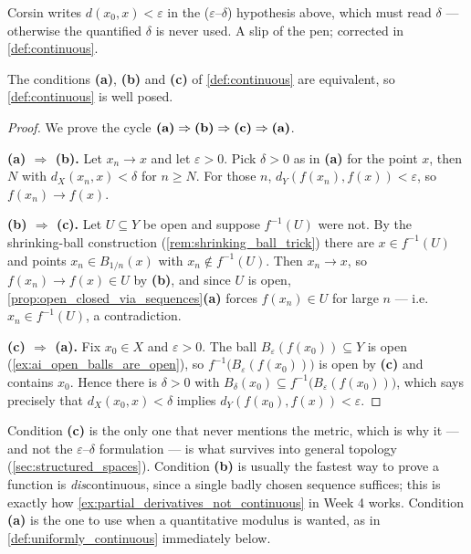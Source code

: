 \begin{ainote}
Corsin writes $d(x_0,x) < \varepsilon$ in the ($\varepsilon$--$\delta$) hypothesis above, which
must read $\delta$ --- otherwise the quantified $\delta$ is never used. A slip of the pen;
corrected in \cref{def:continuous}.
\end{ainote}

\begin{proposition}
\label{prop:continuity_equivalences}
The conditions \textbf{(a)}, \textbf{(b)} and \textbf{(c)} of \cref{def:continuous} are
equivalent, so \cref{def:continuous} is well posed.
\end{proposition}

\begin{proof}
We prove the cycle
$\text{\textbf{(a)}} \Rightarrow \text{\textbf{(b)}} \Rightarrow \text{\textbf{(c)}}
\Rightarrow \text{\textbf{(a)}}$.

\textbf{(a) $\Rightarrow$ (b).} Let $x_n \to x$ and let $\varepsilon>0$. Pick $\delta>0$ as in
\textbf{(a)} for the point $x$, then $N$ with $d_X(x_n,x)<\delta$ for $n \geq N$. For those $n$,
$d_Y(f(x_n),f(x)) < \varepsilon$, so $f(x_n) \to f(x)$.

\textbf{(b) $\Rightarrow$ (c).} Let $U \subseteq Y$ be open and suppose $f^{-1}(U)$ were not.
By the shrinking-ball construction (\cref{rem:shrinking_ball_trick}) there are
$x \in f^{-1}(U)$ and points $x_n \in B_{1/n}(x)$ with $x_n \notin f^{-1}(U)$. Then $x_n \to x$,
so $f(x_n) \to f(x) \in U$ by \textbf{(b)}, and since $U$ is open,
\cref{prop:open_closed_via_sequences}\textbf{(a)} forces $f(x_n) \in U$ for large $n$ ---
i.e.\ $x_n \in f^{-1}(U)$, a contradiction.

\textbf{(c) $\Rightarrow$ (a).} Fix $x_0 \in X$ and $\varepsilon>0$. The ball
$B_\varepsilon(f(x_0)) \subseteq Y$ is open (\cref{ex:ai_open_balls_are_open}), so
$f^{-1}\big(B_\varepsilon(f(x_0))\big)$ is open by \textbf{(c)} and contains $x_0$. Hence there
is $\delta>0$ with $B_\delta(x_0) \subseteq f^{-1}\big(B_\varepsilon(f(x_0))\big)$, which says
precisely that $d_X(x_0,x)<\delta$ implies $d_Y(f(x_0),f(x))<\varepsilon$.
\end{proof}

\begin{remark}
Condition \textbf{(c)} is the only one that never mentions the metric, which is why it --- and
not the $\varepsilon$--$\delta$ formulation --- is what survives into general topology
(\cref{sec:structured_spaces}). Condition \textbf{(b)} is usually the fastest way to prove a
function is \emph{dis}continuous, since a single badly chosen sequence suffices; this is exactly
how \cref{ex:partial_derivatives_not_continuous} in Week 4 works. Condition \textbf{(a)} is the
one to use when a quantitative modulus is wanted, as in
\cref{def:uniformly_continuous} immediately below.
\end{remark}

